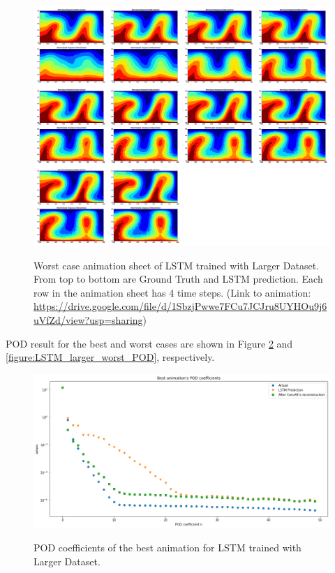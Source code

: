 \begin{figure}[H]
    \centering
    \caption{Worst case animation sheet of LSTM trained with Larger Dataset. From top to bottom are Ground Truth and LSTM prediction. Each row in the animation sheet has 4 time steps. (Link to animation: \url{https://drive.google.com/file/d/1SbzjPwwe7FCu7JCJru8UYHOu9j6uVfZd/view?usp=sharing})}
    \includegraphics[scale=0.15]{figures/mantle_convection_images/larger_dataset/LSTM_Worst_GIF_sheet.png}
    \label{figure:LSTM_larger_worst_gif}
\end{figure}

POD result for the best and worst cases are shown in Figure \ref{figure:LSTM_larger_best_POD} and \ref{figure:LSTM_larger_worst_POD}, respectively.

\begin{figure}[H]
    \centering
    \caption{POD coefficients of the best animation for LSTM trained with Larger Dataset.}
    \includegraphics[scale=0.4]{figures/mantle_convection_images/larger_dataset/LSTM_Best_POD.png}
    \label{figure:LSTM_larger_best_POD}
\end{figure}


